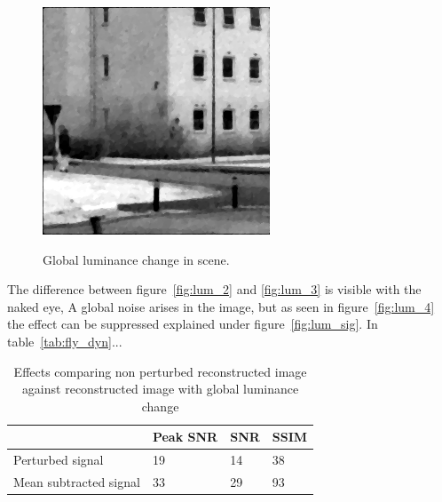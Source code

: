 \begin{figure}[H]
\begin{minipage}[t]{0.245\textwidth}
    \label{fig:lum_3}
\end{minipage}
\begin{minipage}[t]{0.245\textwidth}
    \includegraphics[width = \textwidth]{result/dynamic/lum/intense_change_movemean_psnr_33_snr_29_sssim_93.png}
    \label{fig:lum_4}
\end{minipage}
    \caption{Global luminance change in scene.}
    \label{fig:lum_dyn}
\end{figure}


The difference between figure~\ref{fig:lum_2} and \ref{fig:lum_3} is visible with the naked eye, A global noise arises in the image, but as seen in figure~\ref{fig:lum_4} the effect can be suppressed explained under figure~\ref{fig:lum_sig}. In table~\ref{tab:fly_dyn}...


\begin{table}[H]
    \centering
  \begin{tabular}{ | l | l | l | l |}
    \hline
     & Peak SNR & SNR & SSIM \\ \hline
    Perturbed signal & 19 & 14 & 38 \\ \hline
    Mean subtracted signal & 33 & 29 & 93 \\
    \hline
  \end{tabular}
      \caption{Effects comparing non perturbed reconstructed image against reconstructed image with global luminance change}
    \label{tab:lum_dyn}
\end{table}


